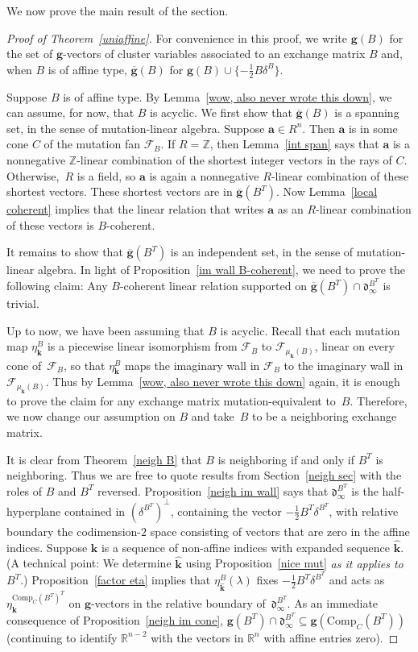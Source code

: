 \documentclass{amsart}
\theoremstyle{definition}
\theoremstyle{remark}
\numberwithin{equation}{section}
\newcommand{\integers}{\mathbb Z}
\newcommand{\reals}{\mathbb R}
\newcommand{\set}[1]{{\lbrace #1 \rbrace}}
\newcommand{\F}{{\mathcal F}}
\newcommand{\0}{{\mathbf{0}}}
\newcommand{\Comp}{\mathrm{Comp}_C}
\newcommand{\g}{\mathbf{g}}
\newcommand{\gp}{\overline{\g}}
\newcommand{\kk}{{\boldsymbol{k}}}
\renewcommand{\a}{\mathbf{a}}
\renewcommand{\d}{{\mathfrak d}}
\begin{document}
We now prove the main result of the section.

\begin{proof}[Proof of Theorem~\ref{uniaffine}]
For convenience in this proof, we write $\g(B)$ for the set of $\g$-vectors of cluster variables associated to an exchange matrix $B$ and, when $B$ is of affine type, $\gp(B)$ for $\g(B)\cup\set{-\frac12B\delta^B}$.

Suppose $B$ is of affine type.
By Lemma~\ref{wow, also never wrote this down}, we can assume, for now, that $B$ is acyclic.
We first show that $\gp(B)$ is a spanning set, in the sense of mutation-linear algebra.
Suppose $\a\in R^n$.
Then $\a$ is in some cone $C$ of the mutation fan $\F_B$.
If $R=\integers$, then Lemma~\ref{int span} says that $\a$ is a nonnegative $\integers$-linear combination of the shortest integer vectors in the rays of $C$.
Otherwise,~$R$ is a field, so $\a$ is again a nonnegative $R$-linear combination of these shortest vectors.
These shortest vectors are in $\gp(B^T)$.
Now Lemma~\ref{local coherent} implies that the linear relation that writes $\a$ as an $R$-linear combination of these vectors is $B$-coherent.

It remains to show that $\gp(B^T)$ is an independent set, in the sense of mutation-linear algebra.
In light of Proposition~\ref{im wall B-coherent}, we need to prove the following claim:
Any $B$-coherent linear relation supported on $\gp(B^T)\cap\d_\infty^{B^T}$ is trivial.

Up to now, we have been assuming that $B$ is acyclic.
Recall that each mutation map $\eta^B_\kk$ is a piecewise linear isomorphism from $\F_B$ to $\F_{\mu_\kk(B)}$, linear on every cone of~$\F_B$, so that $\eta_\kk^B$ maps the imaginary wall in $\F_B$ to the imaginary wall in $\F_{\mu_\kk(B)}$.
Thus by Lemma~\ref{wow, also never wrote this down} again, it is enough to prove the claim for any exchange matrix mutation-equivalent to~$B$.
Therefore, we now change our assumption on $B$ and take~$B$ to be a neighboring exchange matrix.

It is clear from Theorem~\ref{neigh B} that $B$ is neighboring if and only if $B^T$ is neighboring.
Thus we are free to quote results from Section~\ref{neigh sec} with the roles of $B$ and $B^T$ reversed.
Proposition~\ref{neigh im wall} says that $\d^{B^T}_\infty$ is the half-hyperplane contained in $(\delta^{B^T})^\perp$, containing the vector $-\frac12B^T\delta^{B^T}$, with relative boundary the codimension-$2$ space consisting of vectors that are zero in the affine indices.
Suppose $\kk$ is a sequence of non-affine indices with expanded sequence $\widehat\kk$.
(A technical point:  We determine $\widehat\kk$ using Proposition~\ref{nice mut} \emph{as it applies to $B^T$}.)
Proposition~\ref{factor eta} implies that $\eta^B_{\widehat\kk}(\lambda)$ fixes $-\frac12B^T\delta^{B^T}$ and acts as $\eta_\kk^{\Comp(B^T)^T}$ on $\g$-vectors in the relative boundary of~$\d^{B^T}_\infty$.
As an immediate consequence of Proposition~\ref{neigh im cone}, $\g(B^T)\cap\d^{B^T}_\infty\subseteq\g(\Comp(B^T))$ (continuing to identify $\reals^{n-2}$ with the vectors in $\reals^n$ with affine entries zero).  


\end{proof}
\end{document}
